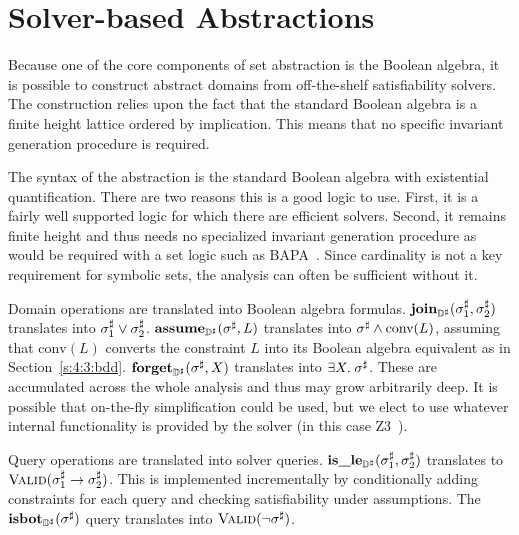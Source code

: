\section{Solver-based Abstractions}
\label{sec:solvers}

Because one of the core components of set abstraction is the Boolean algebra, it is possible to construct abstract domains from off-the-shelf satisfiability solvers.  The construction relies upon the fact that the standard Boolean algebra is a finite height lattice ordered by implication.  This means that no specific invariant generation procedure is required.

The syntax of the abstraction is the standard Boolean algebra with existential quantification.  There are two reasons this is a good logic to use.  First, it is a fairly well supported logic for which there are efficient solvers.  Second, it remains finite height and thus needs no specialized invariant generation procedure as would be required with a set logic such as BAPA~\cite{knr:jar:06}.  Since cardinality is not a key requirement for symbolic sets, the analysis can often be sufficient without it.

Domain operations are translated into Boolean algebra formulas.  $\textbf{join}_{{\mathbb{D}}^{\sharp}}({\sigma}^{\sharp}_1,{\sigma}^{\sharp}_2)$ translates into ${\sigma}^{\sharp}_1 \vee {\sigma}^{\sharp}_2$.  $\textbf{assume}_{{\mathbb{D}}^{\sharp}}({\sigma}^{\sharp}, L)$ translates into ${\sigma}^{\sharp} \wedge \textrm{conv}(L)$, assuming that $\textrm{conv}(L)$ converts the constraint $L$ into its Boolean algebra equivalent as in Section~\ref{s:4:3:bdd}.  $\textbf{forget}_{{\mathbb{D}}^{\sharp}}({\sigma}^{\sharp}, X)$ translates into $\exists X. \; {\sigma}^{\sharp}$.  These are accumulated across the whole analysis and thus may grow arbitrarily deep.  It is possible that on-the-fly simplification could be used, but we elect to use whatever internal functionality is provided by the solver (in this case Z3~\cite{mb:tacas:08}).

Query operations are translated into solver queries.  $\textbf{is\_le}_{{\mathbb{D}}^{\sharp}}({\sigma}^{\sharp}_1, {\sigma}^{\sharp}_2)$ translates to $\textsc{Valid}({\sigma}^{\sharp}_1 \rightarrow {\sigma}^{\sharp}_2)$.  This is implemented incrementally by conditionally adding constraints for each query and checking satisfiability under assumptions.  The $\textbf{isbot}_{{\mathbb{D}}^{\sharp}}({\sigma}^{\sharp})$ query translates into $\textsc{Valid}(\neg {\sigma}^{\sharp})$.

